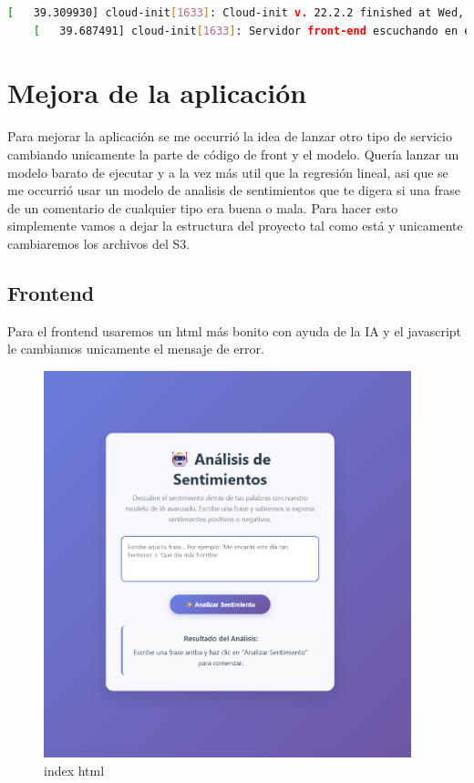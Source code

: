 \documentclass{article}
\begin{document}
 	\begin{lstlisting}[style=consola, language=bash, caption={front logs}]
	[   39.309930] cloud-init[1633]: Cloud-init v. 22.2.2 finished at Wed, 01 Oct 2025 21:42:02 +0000. Datasource DataSourceEc2.  Up 39.29 seconds
	[   39.687491] cloud-init[1633]: Servidor front-end escuchando en el puerto 80 \end{lstlisting}

	\section{Mejora de la aplicación}

	Para mejorar la aplicación se me occurrió la idea de lanzar otro tipo de servicio cambiando unicamente la parte de código de front y el modelo. Quería lanzar un modelo barato de ejecutar y a la vez más util que la regresión lineal, asi que se me occurrió usar un modelo de analisis de sentimientos que te digera si una frase de un comentario de cualquier tipo era buena o mala. Para hacer esto simplemente vamos a dejar la estructura del proyecto tal como está y unicamente cambiaremos los archivos del S3.

	\subsection{Frontend}
	Para el frontend usaremos un html más bonito con ayuda de la IA y el javascript le cambiamos unicamente el mensaje de error.

			
	\begin{figure}[H]
	\centering
	\includegraphics[width=0.95\textwidth]{index_html2.png}
	\caption{index html}
	\end{figure}
\end{document}
